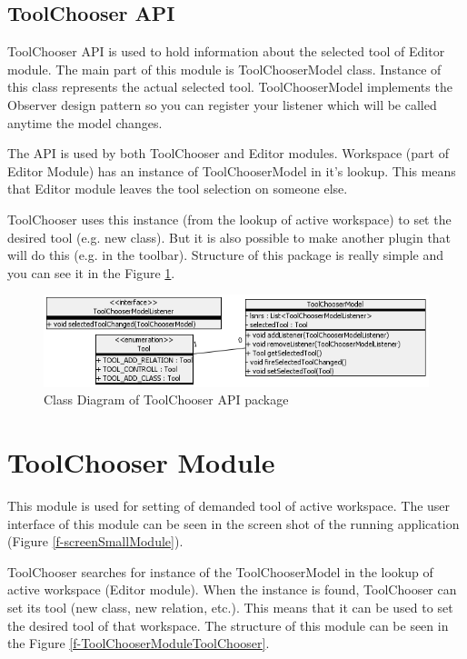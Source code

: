 \subsection{ToolChooser API}

ToolChooser API is used to hold information about the selected tool of Editor module. The main part of this module is ToolChooserModel class. Instance of this class represents the actual selected tool. ToolChooserModel implements the Observer design pattern so you can register your listener which will be called anytime the model changes.

The API is used by both ToolChooser and Editor modules. Workspace (part of Editor Module) has an instance of ToolChooserModel in it's lookup. This means that Editor module leaves the tool selection on someone else.

ToolChooser uses this instance (from the lookup of active workspace) to set the desired tool (e.g. new class).  But it is also possible to make another plugin that will do this (e.g. in the toolbar). Structure of this package is really simple and you can see it in the Figure \ref{f-ModuleAPIToolChooserModel}.

\begin{figure}[!ht]
\begin{center}
\includegraphics[width=\textwidth]{img/ModuleAPIToolChooserModel.png}
\caption{Class Diagram of ToolChooser API package}
\label{f-ModuleAPIToolChooserModel}
\end{center}
\end{figure}

\section{ToolChooser Module}
\label{section:toolChooserModule}

This module is used for setting of demanded tool of active workspace. The user interface of this module can be seen in the screen shot of the running application (Figure \ref{f-screenSmallModule}).

ToolChooser searches for instance of the ToolChooserModel in the lookup of active workspace (Editor module). When the instance is found, ToolChooser can set its tool (new class, new relation, etc.). This means that it can be used to set the desired tool of that workspace. The structure of this module can be seen in the Figure \ref{f-ToolChooserModuleToolChooser}.


